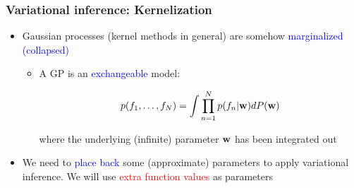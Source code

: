 \documentclass{beamer}
\begin{document}
\frame
{

\frametitle{Variational inference: Kernelization}


\begin{itemize} 


\item Gaussian processes (kernel methods in general) are somehow 
\textcolor{blue}{marginalized (collapsed)} 
      

\begin{itemize} 

\item A GP is an \textcolor{blue}{exchangeable} model:

 $$
 p(f_1,\ldots,f_N) = \int \prod_{n=1}^N p(f_n|\mathbf{w}) d P(\mathbf{w})
 $$
 
 where the underlying (infinite) parameter $\mathbf{w}$ has been integrated out 

  

\end{itemize}
 
\item We need to \textcolor{blue}{place back} some (approximate) parameters 
to apply  variational inference. We will use \textcolor{red}{extra function 
values} as parameters


\end{itemize}


}
\end{document}
